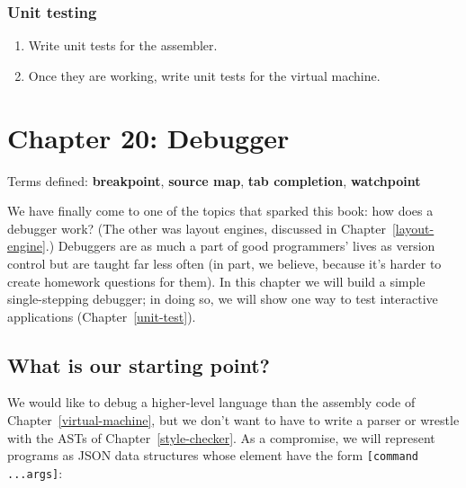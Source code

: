 \documentclass[krantzl]{krantz}
\newcommand{\chapref}[1]{Chapter~\ref{#1}}
\newcommand{\glossref}[1]{\textbf{#1}}
\begin{document}
\subsection*{Unit testing}

\begin{enumerate}

\item 

Write unit tests for the assembler.



\item 

Once they are working,
    write unit tests for the virtual machine.



\end{enumerate}

\chapter{Chapter 20: Debugger}\label{debugger}


\noindent 
    Terms defined:
    \glossref{breakpoint}, \glossref{source map}, \glossref{tab completion}, \glossref{watchpoint}



We have finally come to one of the topics that sparked this book:
how does a debugger work?
(The other was layout engines, discussed in \chapref{layout-engine}.)
Debuggers are as much a part of good programmers' lives as version control
but are taught far less often
(in part, we believe, because it's harder to create homework questions for them).
In this chapter we will build a simple single-stepping debugger;
in doing so,
we will show one way to test interactive applications (\chapref{unit-test}).

\section{What is our starting point?}\label{debugger-start}


We would like to debug a higher-level language than the assembly code of \chapref{virtual-machine},
but we don't want to have to write a parser
or wrestle with the ASTs of \chapref{style-checker}.
As a compromise,
we will represent programs as JSON data structures
whose element have the form \texttt{[command ...args]}:
\end{document}
